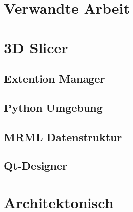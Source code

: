 \section{Verwandte Arbeit}
\label{sec:verwwandte_arbeit}

\section{3D Slicer}
\label{sec:3d_slicer}

\subsection{Extention Manager}

\subsection{Python Umgebung}

\subsection{MRML Datenstruktur}

\subsection{Qt-Designer}

\section{Architektonisch}
\label{sec:architektonisch}